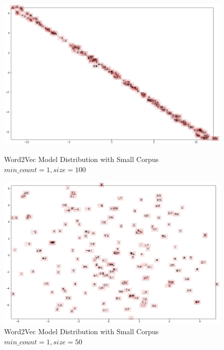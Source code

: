 \documentclass[sigconf]{acmart}
\begin{document}
\begin{figure}
\includegraphics[width = .8\textwidth]{word2vec_1_100.png}
\caption{Word2Vec Model Distribution with Small Corpus $min \_count=1, size=100$}
\label{fig:word2vec_1_100}

\includegraphics[width = .8\textwidth]{word2vec_15_50.png}
\caption{Word2Vec Model Distribution with Small Corpus $min \_count=1, size=50$}
\label{fig:word2vec_15_50}

\end{figure}
\end{document}

